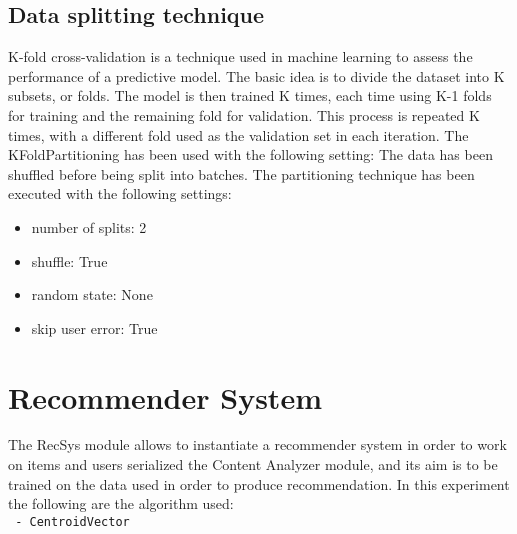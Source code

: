 \documentclass[11pt]{article}
\begin{document}
\hfill\break



\subsection{Data splitting technique}\label{subsec:partitioning}
K-fold cross-validation is a technique used in machine learning to assess the performance of a predictive model.
The basic idea is to divide the dataset into K subsets, or folds.
The model is then trained K times, each time using K-1 folds for training and the remaining fold for validation.
This process is repeated K times, with a different fold used as the validation set in each iteration.
\hfill\break
The KFoldPartitioning has been used with the following setting:
\hfill\break
The data has been shuffled before being split into batches.
The partitioning technique has been executed with the following settings:
\begin{itemize}
    \item number of splits: 2
    \item shuffle: True
    \item random state: None
    \item skip user error: True
\end{itemize}
\hfill\break

\hfill\break
\hfill\break


\section{Recommender System}\label{sec:recsys}
The RecSys module allows to instantiate a recommender system in order to work on items and users serialized
the Content Analyzer module, and its aim is to be trained on the data used in order to produce recommendation.
In this experiment the following are the algorithm used: \\


    \lstinline[style=verbatim-text]| - CentroidVector |  \\

\end{document}
